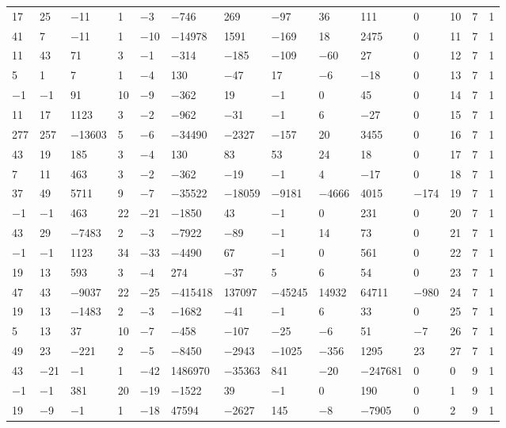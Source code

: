 \documentclass[pdftex]{sigma}
\numberwithin{equation}{section}
\theoremstyle{definition}
\numberwithin{table}{section}
\begin{document}
{\begin{paracol}{3}
\begin{supertabular}{|w{c}{.32cm}w{c}{.32cm}w{c}{.32cm}@{\hspace{.5cm}}w{c}{.2cm}w{c}{.2cm}|@{\hspace{\tabcolsep}}HHHHHHw{c}{.17cm}w{c}{.17cm}w{c}{.17cm}|}
			17 & 25 & $-$11 & 1 & $-$3 & $-$746 & 269 & $-$97 & 36 & 111 & 0 & 10 & 7 & 1 \\
			41 & 7 & $-$11 & 1 & $-$10 & $-$14978 & 1591 & $-$169 & 18 & 2475 & 0 & 11 & 7 & 1 \\
			11 & 43 & 71 & 3 & $-$1 & $-$314 & $-$185 & $-$109 & $-$60 & 27 & 0 & 12 & 7 & 1 \\
			5 & 1 & 7 & 1 & $-$4 & 130 & $-$47 & 17 & $-$6 & $-$18 & 0 & 13 & 7 & 1 \\
			$-$1 & $-$1 & 91 & 10 & $-$9 & $-$362 & 19 & $-$1 & 0 & 45 & 0 & 14 & 7 & 1 \\
			11 & 17 & 1123 & 3 & $-$2 & $-$962 & $-$31 & $-$1 & 6 & $-$27 & 0 & 15 & 7 & 1 \\
			277 & 257 & $-$13603 & 5 & $-$6 & $-$34490 & $-$2327 & $-$157 & 20 & 3455 & 0 & 16 & 7 & 1 \\
			43 & 19 & 185 & 3 & $-$4 & 130 & 83 & 53 & 24 & 18 & 0 & 17 & 7 & 1 \\
			7 & 11 & 463 & 3 & $-$2 & $-$362 & $-$19 & $-$1 & 4 & $-$17 & 0 & 18 & 7 & 1 \\
			37 & 49 & 5711 & 9 & $-$7 & $-$35522 & $-$18059 & $-$9181 & $-$4666 & 4015 & $-$174 & 19 & 7 & 1 \\
			$-$1 & $-$1 & 463 & 22 & $-$21 & $-$1850 & 43 & $-$1 & 0 & 231 & 0 & 20 & 7 & 1 \\
			43 & 29 & $-$7483 & 2 & $-$3 & $-$7922 & $-$89 & $-$1 & 14 & 73 & 0 & 21 & 7 & 1 \\
			$-$1 & $-$1 & 1123 & 34 & $-$33 & $-$4490 & 67 & $-$1 & 0 & 561 & 0 & 22 & 7 & 1 \\
			19 & 13 & 593 & 3 & $-$4 & 274 & $-$37 & 5 & 6 & 54 & 0 & 23 & 7 & 1 \\
			47 & 43 & $-$9037 & 22 & $-$25 & $-$415418 & 137097 & $-$45245 & 14932 & 64711 & $-$980 & 24 & 7 & 1 \\
			19 & 13 & $-$1483 & 2 & $-$3 & $-$1682 & $-$41 & $-$1 & 6 & 33 & 0 & 25 & 7 & 1 \\
			5 & 13 & 37 & 10 & $-$7 & $-$458 & $-$107 & $-$25 & $-$6 & 51 & $-$7 & 26 & 7 & 1 \\
			49 & 23 & $-$221 & 2 & $-$5 & $-$8450 & $-$2943 & $-$1025 & $-$356 & 1295 & 23 & 27 & 7 & 1 \\
			43 & $-$21 & $-$1 & 1 & $-$42 & 1486970 & $-$35363 & 841 & $-$20 & $-$247681 & 0 & 0 & 9 & 1 \\
			$-$1 & $-$1 & 381 & 20 & $-$19 & $-$1522 & 39 & $-$1 & 0 & 190 & 0 & 1 & 9 & 1 \\
			19 & $-$9 & $-$1 & 1 & $-$18 & 47594 & $-$2627 & 145 & $-$8 & $-$7905 & 0 & 2 & 9 & 1 \\

\end{supertabular}
\end{paracol}}
\end{document}
